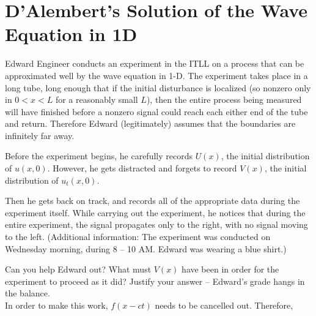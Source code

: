 \documentclass[10pt]{article}
\begin{document}
\newpage
\section{D'Alembert's Solution of the Wave Equation in 1D}

Edward Engineer conducts an experiment in the ITLL on a process that can be approximated well by the wave equation in
1-D. The experiment takes place in a long tube, long enough that if the initial disturbance is localized (so nonzero
only in $0<x<L$ for a reasonably small $L$), then the entire process being measured will have finished before a nonzero
signal could reach each either end of the tube and return. Therefore Edward (legitimately) assumes that the boundaries
are infinitely far away.

Before the experiment begins, he carefully records $U(x)$, the initial distribution of $u(x, 0)$.  However, he gets
distracted and forgets to record $V(x)$, the initial distribution of $u_t(x, 0)$.

Then he gets back on track, and records all of the appropriate data during the experiment itself. While carrying out the
experiment, he notices that during the entire experiment, the signal propagates only to the right, with no signal moving
to the left. (Additional information: The experiment was conducted on Wednesday morning, during 8 -- 10 AM.  Edward was
wearing a blue shirt.)

Can you help Edward out? What must $V(x)$ have been in order for the experiment to proceed as it did? Justify your
answer -- Edward's grade hangs in the balance.\\

In order to make this work, $f(x-ct)$ needs to be cancelled out. Therefore,

\end{document}
